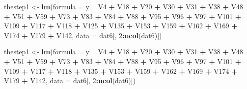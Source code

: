 \documentclass[
]{article}
\newenvironment{Shaded}{\begin{snugshade}}{\end{snugshade}}
\newcommand{\DataTypeTok}[1]{\textcolor[rgb]{0.13,0.29,0.53}{#1}}
\newcommand{\DecValTok}[1]{\textcolor[rgb]{0.00,0.00,0.81}{#1}}
\newcommand{\KeywordTok}[1]{\textcolor[rgb]{0.13,0.29,0.53}{\textbf{#1}}}
\newcommand{\NormalTok}[1]{#1}
\newcommand{\OperatorTok}[1]{\textcolor[rgb]{0.81,0.36,0.00}{\textbf{#1}}}
\newcommand{\StringTok}[1]{\textcolor[rgb]{0.31,0.60,0.02}{#1}}
\begin{document}
\begin{Shaded}
\begin{Highlighting}[]
\NormalTok{thestep1 <-}\StringTok{ }\KeywordTok{lm}\NormalTok{(}\DataTypeTok{formula =}\NormalTok{ y }\OperatorTok{~}\StringTok{ }\NormalTok{V4 }\OperatorTok{+}\StringTok{ }\NormalTok{V18 }\OperatorTok{+}\StringTok{ }\NormalTok{V20 }\OperatorTok{+}\StringTok{ }\NormalTok{V30 }\OperatorTok{+}\StringTok{ }\NormalTok{V31 }\OperatorTok{+}\StringTok{ }\NormalTok{V38 }\OperatorTok{+}\StringTok{ }\NormalTok{V48 }\OperatorTok{+}\StringTok{ }\NormalTok{V51 }\OperatorTok{+}\StringTok{ }
\StringTok{    }\NormalTok{V59 }\OperatorTok{+}\StringTok{ }\NormalTok{V73 }\OperatorTok{+}\StringTok{ }\NormalTok{V83 }\OperatorTok{+}\StringTok{ }\NormalTok{V84 }\OperatorTok{+}\StringTok{ }\NormalTok{V88 }\OperatorTok{+}\StringTok{ }\NormalTok{V95 }\OperatorTok{+}\StringTok{ }\NormalTok{V96 }\OperatorTok{+}\StringTok{ }\NormalTok{V97 }\OperatorTok{+}\StringTok{ }\NormalTok{V101 }\OperatorTok{+}\StringTok{ }\NormalTok{V109 }\OperatorTok{+}\StringTok{ }
\StringTok{    }\NormalTok{V117 }\OperatorTok{+}\StringTok{ }\NormalTok{V118 }\OperatorTok{+}\StringTok{ }\NormalTok{V125 }\OperatorTok{+}\StringTok{ }\NormalTok{V135 }\OperatorTok{+}\StringTok{ }\NormalTok{V153 }\OperatorTok{+}\StringTok{ }\NormalTok{V159 }\OperatorTok{+}\StringTok{ }\NormalTok{V162 }\OperatorTok{+}\StringTok{ }\NormalTok{V169 }\OperatorTok{+}\StringTok{ }
\StringTok{    }\NormalTok{V174 }\OperatorTok{+}\StringTok{ }\NormalTok{V179 }\OperatorTok{+}\StringTok{ }\NormalTok{V142, }\DataTypeTok{data =}\NormalTok{ dat6[, }\DecValTok{2}\OperatorTok{:}\KeywordTok{ncol}\NormalTok{(dat6)])}

\NormalTok{thestep1 <-}\StringTok{ }\KeywordTok{lm}\NormalTok{(}\DataTypeTok{formula =}\NormalTok{ y }\OperatorTok{~}\StringTok{ }\NormalTok{V4 }\OperatorTok{+}\StringTok{ }\NormalTok{V18 }\OperatorTok{+}\StringTok{ }\NormalTok{V20 }\OperatorTok{+}\StringTok{ }\NormalTok{V30 }\OperatorTok{+}\StringTok{ }\NormalTok{V31 }\OperatorTok{+}\StringTok{ }\NormalTok{V38 }\OperatorTok{+}\StringTok{ }\NormalTok{V48 }\OperatorTok{+}\StringTok{ }\NormalTok{V51 }\OperatorTok{+}\StringTok{ }
\StringTok{    }\NormalTok{V59 }\OperatorTok{+}\StringTok{ }\NormalTok{V73 }\OperatorTok{+}\StringTok{ }\NormalTok{V83 }\OperatorTok{+}\StringTok{ }\NormalTok{V84 }\OperatorTok{+}\StringTok{ }\NormalTok{V88 }\OperatorTok{+}\StringTok{ }\NormalTok{V95 }\OperatorTok{+}\StringTok{ }\NormalTok{V96 }\OperatorTok{+}\StringTok{ }\NormalTok{V97 }\OperatorTok{+}\StringTok{ }\NormalTok{V101 }\OperatorTok{+}\StringTok{ }\NormalTok{V109 }\OperatorTok{+}\StringTok{ }
\StringTok{    }\NormalTok{V117 }\OperatorTok{+}\StringTok{ }\NormalTok{V118 }\OperatorTok{+}\StringTok{ }\NormalTok{V135 }\OperatorTok{+}\StringTok{ }\NormalTok{V153 }\OperatorTok{+}\StringTok{ }\NormalTok{V159 }\OperatorTok{+}\StringTok{ }\NormalTok{V162 }\OperatorTok{+}\StringTok{ }\NormalTok{V169 }\OperatorTok{+}\StringTok{ }
\StringTok{    }\NormalTok{V174 }\OperatorTok{+}\StringTok{ }\NormalTok{V179 }\OperatorTok{+}\StringTok{ }\NormalTok{V142, }\DataTypeTok{data =}\NormalTok{ dat6[, }\DecValTok{2}\OperatorTok{:}\KeywordTok{ncol}\NormalTok{(dat6)])}


\end{Highlighting}
\end{Shaded}
\end{document}
